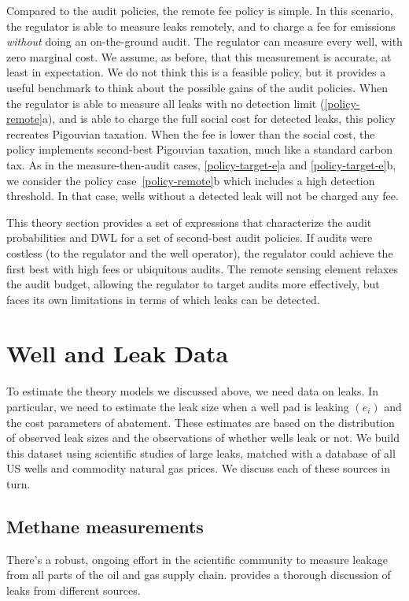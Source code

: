 \documentclass[12pt,oneside,letterpaper]{article}
\theoremstyle{definition}
\begin{document}
\begin{refsection}
Compared to the audit policies, the remote fee policy is simple.
In this scenario, the regulator is able to measure leaks remotely, and to charge a fee for emissions \emph{without} doing an on-the-ground audit.
The regulator can measure every well, with zero marginal cost.
We assume, as before, that this measurement is accurate, at least in expectation.
We do not think this is a feasible policy, but it provides a useful benchmark to think about the possible gains of the audit policies.
When the regulator is able to measure all leaks with no detection limit (\ref{policy-remote}a),
and is able to charge the full social cost for detected leaks, this policy recreates Pigouvian taxation.
When the fee is lower than the social cost, the policy implements second-best Pigouvian taxation, much like a standard carbon tax.
As in the measure-then-audit cases, \ref{policy-target-e}a and \ref{policy-target-e}b, we consider the policy case~\ref{policy-remote}b which includes a high detection threshold.
In that case, wells without a detected leak will not be charged any fee.



This theory section provides a set of expressions that characterize the audit probabilities and \gls{DWL} for a set of second-best audit policies.
If audits were costless (to the regulator and the well operator), the regulator could achieve the first best with high fees or ubiquitous audits.
The remote sensing element relaxes the audit budget, allowing the regulator to target audits more effectively, but faces its own limitations in terms of which leaks can be detected.

\section{Well and Leak Data}
\label{sec:well-and-leak-data}

To estimate the theory models we discussed above, we need data on leaks.
In particular, we need to estimate the leak size when a well pad is leaking \((e_i)\) and the cost parameters of abatement.
These estimates are based on the distribution of observed leak sizes and the observations of whether wells leak or not.
We build this dataset using scientific studies of large leaks, matched with a database of all US wells and commodity natural gas prices.
We discuss each of these sources in turn.


\subsection{Methane measurements}
\label{sec:methane-measures}
There's a robust, ongoing effort in the scientific community to measure leakage from all parts of the oil and gas supply chain.
\textcite{Alvarez/etal:2018} provides a thorough discussion of leaks from different sources.


\end{refsection}
\end{document}
